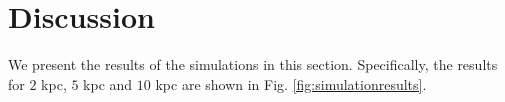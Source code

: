 \documentclass[aps,twocolumn,showpacs,groupedaddress, nofootinbib]{revtex4}  %
\begin{document}
\section{Discussion}\label{sec:disuss}
We present the results of the simulations in this section.
Specifically, the results for $2$ kpc, $5$ kpc and $10$ kpc are shown in Fig. \ref{fig:simulationresults}.
\begin{figure}
     \begin{center}
        \quad
        \quad
        \quad
        \quad
\end{center}
\end{figure}
\end{document}
